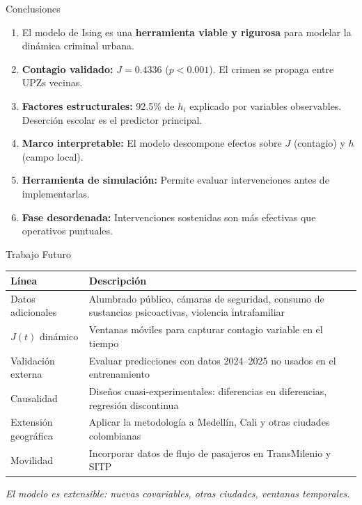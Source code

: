 \documentclass[11pt]{beamer}
\begin{document}
\begin{frame}{Conclusiones}

\begin{enumerate}
    \item El modelo de Ising es una \textbf{herramienta viable y rigurosa} para modelar la dinámica criminal urbana.
    
    \item \textbf{Contagio validado:} $J = 0.4336$ ($p < 0.001$). El crimen se propaga entre UPZs vecinas.
    
    \item \textbf{Factores estructurales:} 92.5\% de $h_i$ explicado por variables observables. Deserción escolar es el predictor principal.
    
    \item \textbf{Marco interpretable:} El modelo descompone efectos sobre $J$ (contagio) y $h$ (campo local).
    
    \item \textbf{Herramienta de simulación:} Permite evaluar intervenciones antes de implementarlas.
    
    \item \textbf{Fase desordenada:} Intervenciones sostenidas son más efectivas que operativos puntuales.
\end{enumerate}
\end{frame}

\begin{frame}{Trabajo Futuro}

\vspace{0.2cm}

\begin{tabular}{p{} p{}}
\hline
\textbf{Línea} & \textbf{Descripción} \\
\hline
Datos adicionales & Alumbrado público, cámaras de seguridad, consumo de sustancias psicoactivas, violencia intrafamiliar \\
\hline
$J(t)$ dinámico & Ventanas móviles para capturar contagio variable en el tiempo \\
\hline
Validación externa & Evaluar predicciones con datos 2024--2025 no usados en el entrenamiento \\
\hline
Causalidad & Diseños cuasi-experimentales: diferencias en diferencias, regresión discontinua \\
\hline
Extensión geográfica & Aplicar la metodología a Medellín, Cali y otras ciudades colombianas \\
\hline
Movilidad & Incorporar datos de flujo de pasajeros en TransMilenio y SITP \\
\hline
\end{tabular}

\vspace{0.3cm}
\begin{center}
\small \textit{El modelo es extensible: nuevas covariables, otras ciudades, ventanas temporales.}
\end{center}
\end{frame}
\end{document}
